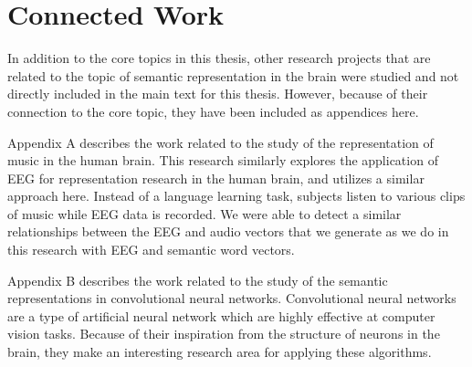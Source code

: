 \section{Connected Work}

In addition to the core topics in this thesis, other research projects that are 
related to the topic of semantic representation in the brain were studied and 
not directly included in the main text for this thesis. However, because of 
their connection to the core topic, they have been included as appendices here.

Appendix A describes the work related to the study of the representation of 
music in the human brain. This research similarly explores the application of 
EEG for representation research in the human brain, and utilizes a similar 
approach here. Instead of a language learning task, subjects listen to various 
clips of music while EEG data is recorded. We were able to detect a similar 
relationships between the EEG and audio vectors that we generate as we do in 
this research with EEG and semantic word vectors.

Appendix B describes the work related to the study of the semantic 
representations in convolutional neural networks. Convolutional neural networks 
are a type of artificial neural network which are highly effective at computer 
vision tasks. Because of their inspiration from the structure of neurons in the 
brain, they make an interesting research area for applying these algorithms. 
